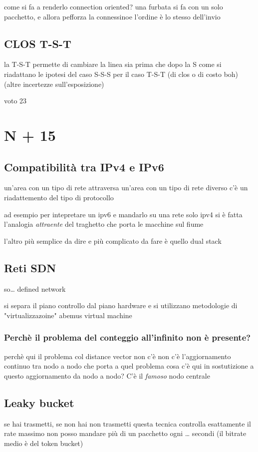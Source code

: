\documentclass[11pt]{article}
\begin{document}
come si fa a renderlo connection oriented? una furbata
si fa con un solo pacchetto, e allora pefforza la connessinoe l'ordine è lo stesso dell'invio

\subsection{CLOS T-S-T}
\label{sec:org1427996}
la T-S-T permette di cambiare la linea sia prima che dopo la S
come si riadattano le ipotesi del caso S-S-S per il caso T-S-T (di clos o di costo boh)
(altre incertezze sull'esposizione)

voto 23

\section{N + 15}
\label{sec:org2b3e465}
\subsection{Compatibilità tra IPv4 e IPv6}
\label{sec:orgf7a1f30}
un'area con un tipo di rete attraversa un'area con un tipo di rete diverso
c'è un riadattemento del tipo di protocollo

ad esempio per intepretare un ipv6 e mandarlo su una rete solo ipv4
si è fatta l'analogia \emph{attraente} del traghetto che porta le macchine sul fiume

l'altro più semplice da dire e più complicato da fare è quello dual stack

\subsection{Reti SDN}
\label{sec:orgbeaca28}
so\ldots{} defined network

si separa il piano controllo dal piano hardware e si utilizzano metodologie di "virtualizzazoine"
abemus virtual machine
\subsubsection{Perchè il problema del conteggio all'infinito non è presente?}
\label{sec:orgd1d3d2e}
perchè qui il problema col distance vector non c'è
non c'è l'aggiornamento continuo tra nodo a nodo che porta a quel problema
cosa c'è qui in sostutizione a questo aggiornamento da nodo a nodo? C'è il \emph{famoso} nodo centrale

\subsection{Leaky bucket}
\label{sec:orgeea4c9b}
se hai trasmetti, se non hai non trasmetti
questa tecnica controlla esattamente il rate massimo
non posso mandare più di un pacchetto ogni \ldots{} secondi
(il bitrate medio è del token bucket)
\end{document}
